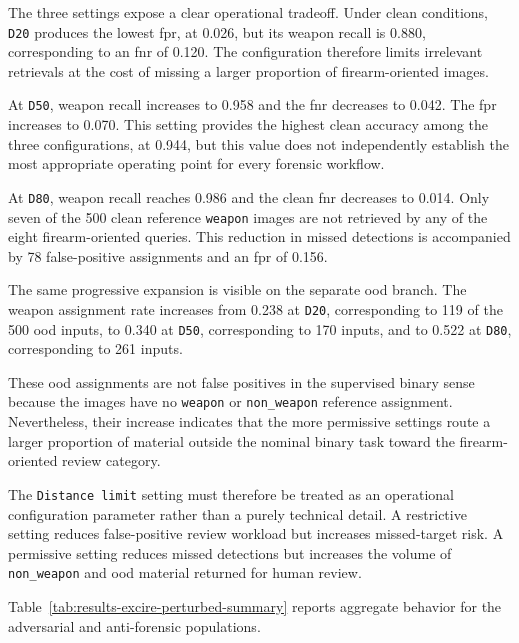 The three settings expose a clear operational tradeoff. Under clean
conditions, \texttt{D20} produces the lowest \gls{fpr}, at 0.026, but its
weapon recall is 0.880, corresponding to an \gls{fnr} of 0.120. The
configuration therefore limits irrelevant retrievals at the cost of missing a
larger proportion of firearm-oriented images.

At \texttt{D50}, weapon recall increases to 0.958 and the \gls{fnr}
decreases to 0.042. The \gls{fpr} increases to 0.070. This setting provides
the highest clean accuracy among the three configurations, at 0.944, but this
value does not independently establish the most appropriate operating point
for every forensic workflow.

At \texttt{D80}, weapon recall reaches 0.986 and the clean \gls{fnr}
decreases to 0.014. Only seven of the 500 clean reference
\texttt{weapon} images are not retrieved by any of the eight firearm-oriented
queries. This reduction in missed detections is accompanied by 78 false-positive
assignments and an \gls{fpr} of 0.156.

The same progressive expansion is visible on the separate \gls{ood} branch.
The weapon assignment rate increases from 0.238 at \texttt{D20}, corresponding
to 119 of the 500 \gls{ood} inputs, to 0.340 at \texttt{D50}, corresponding
to 170 inputs, and to 0.522 at \texttt{D80}, corresponding to 261 inputs.

These \gls{ood} assignments are not false positives in the supervised binary
sense because the images have no \texttt{weapon} or
\texttt{non\_weapon} reference assignment. Nevertheless, their increase
indicates that the more permissive settings route a larger proportion of
material outside the nominal binary task toward the firearm-oriented review
category.

The \texttt{Distance limit} setting must therefore be treated as an operational
configuration parameter rather than a purely technical detail. A restrictive
setting reduces false-positive review workload but increases missed-target
risk. A permissive setting reduces missed detections but increases the volume
of \texttt{non\_weapon} and \gls{ood} material returned for human review.

Table~\ref{tab:results-excire-perturbed-summary} reports aggregate behavior for
the adversarial and anti-forensic populations.

